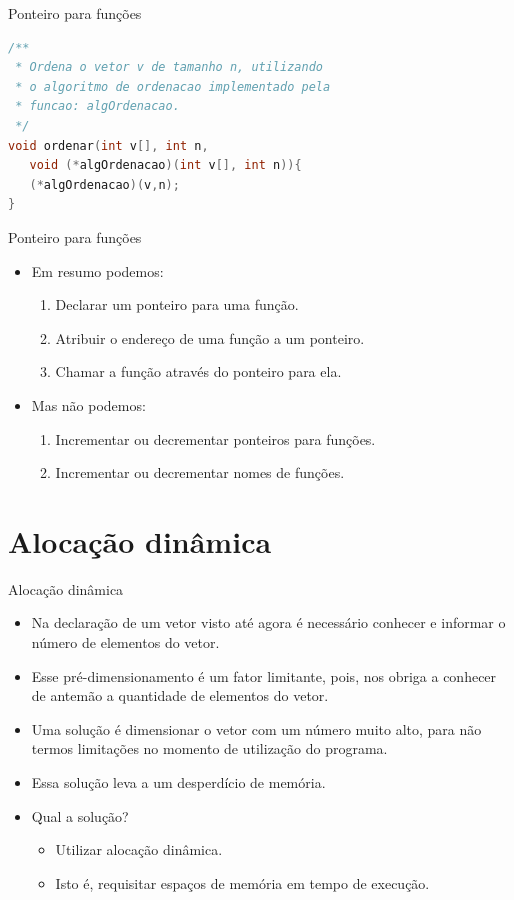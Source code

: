 \begin{frame}[fragile,c]{Ponteiro para funções}  
\begin{lstlisting}[language=C]
/**
 * Ordena o vetor v de tamanho n, utilizando 
 * o algoritmo de ordenacao implementado pela 
 * funcao: algOrdenacao.
 */
void ordenar(int v[], int n, 
   void (*algOrdenacao)(int v[], int n)){   
   (*algOrdenacao)(v,n);     
}
\end{lstlisting}  
\end{frame}

\begin{frame}[fragile,c]{Ponteiro para funções}  
\begin{itemize}
  \item Em resumo podemos:  
    \begin{enumerate}
      \item Declarar um ponteiro para uma função.
      \item Atribuir o endereço de uma função a um ponteiro.
      \item Chamar a função através do ponteiro para ela.
    \end{enumerate}
  \item Mas não podemos:  
    \begin{enumerate}
      \item Incrementar ou decrementar ponteiros para funções.
      \item Incrementar ou decrementar nomes de funções.
    \end{enumerate} 
\end{itemize}
\end{frame}


\section{Alocação dinâmica}
\begin{frame}[c]{Alocação dinâmica}
  \begin{itemize}[<+->]
    \item Na declaração de um vetor visto até agora é necessário conhecer e informar o número de elementos do vetor.
    \item Esse pré-dimensionamento é um fator limitante, pois, nos obriga a conhecer de antemão a quantidade de elementos do vetor.
    \item Uma solução é dimensionar o vetor com um número muito alto, para não termos limitações no momento de utilização do programa.
    \item Essa solução leva a um desperdício de memória.
    \item Qual a solução?   
    \begin{itemize}[<+->]
      \item Utilizar alocação dinâmica.
      \item Isto é, requisitar espaços de memória em tempo de execução.
    \end{itemize}
  \end{itemize}
\end{frame}

